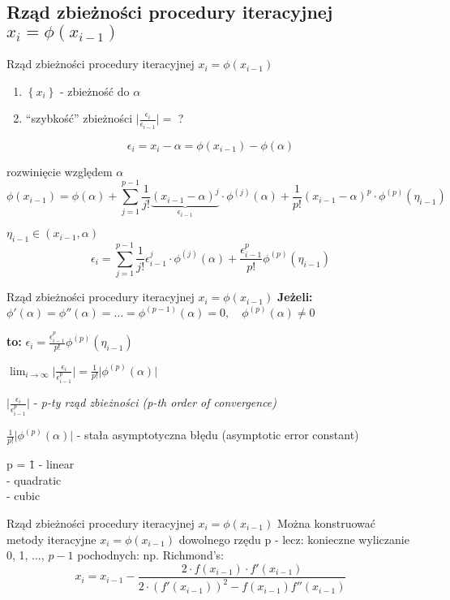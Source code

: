 \subsection{Rząd zbieżności procedury iteracyjnej $x_{i} = \phi(x_{i-1})$}
\begin{frame}{Rząd zbieżności procedury iteracyjnej $x_{i} = \phi(x_{i-1})$}
	\begin{enumerate}
		\item $\left\{x_{i}\right\} $ - zbieżność do $\alpha$
		\item ``szybkość'' zbieżności $\lvert \frac{\epsilon_{i}}{\epsilon_{i-1}} \rvert = $ ?
	\end{enumerate}
	\[
		\epsilon_{i} = x_{i} - \alpha = \phi(x_{i-1}) - \phi(\alpha)
	\]
	
	rozwinięcie względem $\alpha$
	\[
		\phi(x_{i-1}) = \phi(\alpha)+ \sum_{j=1}^{p-1} \frac{1}{j!} \underbrace{(x_{i-1} - \alpha)^{j}}_{\epsilon_{i-1}} \cdot \phi^{(j)}(\alpha) + \frac{1}{p!}(x_{i-1}-\alpha)^{p} \cdot \phi^{(p)}(\eta_{i-1})
	\]
	
	$\eta_{i-1} \in (x_{i-1}, \alpha)$
	\[
		\epsilon_{i} = \sum_{j=1}^{p-1}\frac{1}{j!} \epsilon_{i-1}^{j} \cdot \phi^{(j)}(\alpha) + \frac{\epsilon_{i-1}^{p}}{p!} \phi^{(p)}(\eta_{i-1})
	\]
\end{frame}
\begin{frame}{Rząd zbieżności procedury iteracyjnej $x_{i} = \phi(x_{i-1})$}
	\textbf{Jeżeli: } $\phi'(\alpha) = \phi''(\alpha) = \ldots = \phi^{(p-1)}(\alpha) = 0,\quad \phi^{(p)}(\alpha) \neq 0$\linebreak
	
	\textbf{to: } $\epsilon_{i} = \frac{\epsilon_{i-1}^{p}}{p!} \phi^{(p)}(\eta_{i-1})$\linebreak
	
	$\lim_{i \rightarrow \infty} \lvert \frac{\epsilon_{i}}{\epsilon_{i-1}^{p}} \rvert = \frac{1}{p!} \lvert \phi^{(p)}(\alpha) \rvert$\linebreak
	
	$\lvert \frac{\epsilon_{i}}{\epsilon_{i-1}^{p}} \rvert$ - \textit{p-ty rząd zbieżności (p-th order of convergence)}\linebreak
	
	$\frac{1}{p!} \lvert \phi^{(p)}(\alpha) \rvert$ -  stała asymptotyczna błędu (asymptotic error constant)
	\begin{tabbing}
		p = \= 1 - linear\\
		 - quadratic\\
		 - cubic
	\end{tabbing}
	
\end{frame}
\begin{frame}{Rząd zbieżności procedury iteracyjnej $x_{i} = \phi(x_{i-1})$}
	Można konstruować metody iteracyjne $x_{i} = \phi(x_{i-1})$ dowolnego rzędu p - lecz: konieczne wyliczanie 0, 1, $\ldots$, $p-1$ pochodnych:\linebreak
	np. Richmond's:
	\[
	x_{i} = x_{i-1} - \frac{2 \cdot f(x_{i-1}) \cdot f'(x_{i-1})}{2 \cdot (f'(x_{i-1}))^{2} - f(x_{i-1}) f''(x_{i-1})}
	\]
\end{frame}